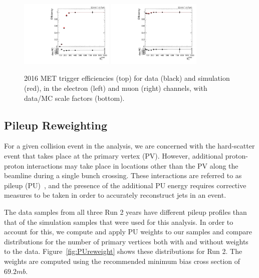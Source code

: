 \begin{figure}[htbp]
  \centering
  \includegraphics[width=0.4\textwidth]{fig/eventSelection/TriggerEff_MET_eleChannel_2016.pdf}
  \includegraphics[width=0.4\textwidth]{fig/eventSelection/TriggerEff_MET_muChannel_2016.pdf}
  \caption{
    2016 MET trigger efficiencies (top) for data (black) and simulation (red), in the electron (left) and muon (right) channels, with data/MC scale factors (bottom).
  }
  \label{fig:mettrigeff2016}
\end{figure}

\subsection{Pileup Reweighting}

For a given collision event in the analysis, we are concerned with the hard-scatter event that takes place at the primary vertex (PV).
However, additional proton-proton interactions may take place in locations other than the PV along the beamline during a single bunch crossing.
These interactions are referred to as pileup (PU)~\cite{Perloff_2012}, and the presence of the additional PU energy requires corrective measures to be taken in order to accurately reconstruct jets in an event.

The data samples from all three Run 2 years have different pileup profiles than that of the simulation samples that were used for this analysis.
In order to account for this, we compute and apply PU weights to our samples and compare distributions for the number of primary vertices both with and without weights to the data.
Figure~\ref{fig:PUreweight} shows these distributions for Run 2.
The weights are computed using the recommended minimum bias cross section of $69.2\unit{mb}$.

